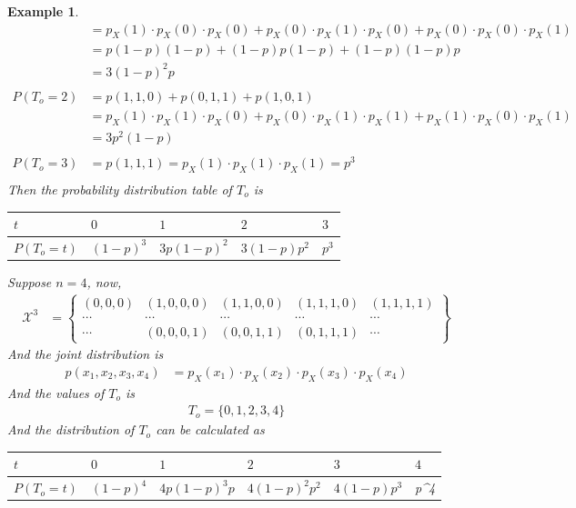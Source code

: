 \documentclass[11pt,oneside]{book}
\theoremstyle{newStyle}
\newtheorem{ex}{Example}[section]
\newcommand{\X}{\mathcal{X}}
\begin{document}
\begin{ex}
\begin{align*}
&=p_X(1)\cdot p_X(0)\cdot p_X(0)+p_X(0)\cdot p_X(1)\cdot p_X(0)+p_X(0)\cdot p_X(0)\cdot p_X(1)\\
&=p(1-p)(1-p)+(1-p)p(1-p)+(1-p)(1-p)p\\
&=3(1-p)^2p\\
\\
P(T_o=2)&=p(1,1,0)+p(0,1,1)+p(1,0,1)\\
&=p_X(1)\cdot p_X(1)\cdot p_X(0)+p_X(0)\cdot p_X(1)\cdot p_X(1)+p_X(1)\cdot p_X(0)\cdot p_X(1)\\
&=3p^2(1-p)\\
\\
P(T_o=3)&=p(1,1,1)=p_X(1)\cdot p_X(1)\cdot p_X(1)=p^3\\
\end{align*}
Then the probability distribution table of $T_o$ is \begin{center}
\begin{tabular}{|l|l|l|l|l|}
\hline
$t$        & $0$       & $1$       & $2$         & $3$   \\ \hline
$P(T_o=t)$ & $(1-p)^3$ & $3p(1-p)^2$ & $3(1-p)p^2$ & $p^3$ \\ \hline
\end{tabular}
\end{center}
Suppose $n=4$, now,\begin{align*}
 \X^3&=\begin{Bmatrix}
 (0,0,0) & (1,0,0,0)&(1,1,0,0)&(1,1,1,0)&(1,1,1,1)\\
  \cdots &\cdots & \cdots  &\cdots &\cdots \\
  \cdots&(0,0,0,1) &(0,0,1,1) & (0,1,1,1)&\cdots
 \end{Bmatrix}
  \end{align*} 
  And the joint distribution is \begin{align*}
  p(x_1,x_2,x_3,x_4)&=p_X(x_1)\cdot p_X(x_2)\cdot p_X(x_3)\cdot p_X(x_4)
  \end{align*}
  And the values of $T_o$ is \begin{align*}
  T_o=\{0,1,2,3,4\}
  \end{align*}
  And the distribution of $T_o$ can be calculated as \begin{center}
\begin{tabular}{|l|l|l|l|l|l|}
\hline
$t$        & $0$       & $1$          & $2$           & $3$         & $4$                  \\ \hline
$P(T_o=t)$ & $(1-p)^4$ & $4p(1-p)^3p$ & $4(1-p)^2p^2$ & $4(1-p)p^3$ & p\textasciicircum{}4 \\ \hline

\end{tabular}
\end{center}
\end{ex}
\end{document}

